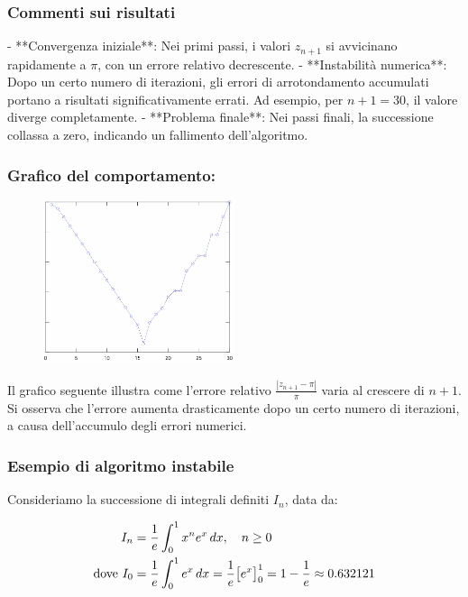 \documentclass[a4paper, 11pt]{article}
\begin{document}
        \subsubsection*{Commenti sui risultati}

        - **Convergenza iniziale**: Nei primi passi, i valori \( z_{n+1} \) si avvicinano rapidamente a \( \pi \), con un errore relativo decrescente.
        - **Instabilità numerica**: Dopo un certo numero di iterazioni, gli errori di arrotondamento accumulati portano a risultati significativamente errati. Ad esempio, per \( n+1 = 30 \), il valore diverge completamente.
        - **Problema finale**: Nei passi finali, la successione collassa a zero, indicando un fallimento dell'algoritmo.

        \subsubsection*{Grafico del comportamento: }

        \begin{figure}[h!] 
            \centering 
            \includegraphics[width=0.5\textwidth]{graph1.png} 
        \end{figure}

        Il grafico seguente illustra come l'errore relativo \( \frac{|z_{n+1} - \pi|}{\pi} \) varia al crescere di \( n+1 \). Si osserva che l'errore aumenta drasticamente dopo un certo numero di iterazioni, a causa dell'accumulo degli errori numerici.

        \subsubsection*{Esempio di algoritmo instabile}
        

        Consideriamo la successione di integrali definiti \( I_n \), data da:


        \begin{align}
            I_n &= \frac{1}{e} \int_{0}^{1} x^n e^x \, dx, \quad n \geq 0 \notag \\
            \text{dove } I_0 &= \frac{1}{e} \int_{0}^{1} e^x \, dx = \frac{1}{e} \big[ e^x \big]_0^1 = 1 - \frac{1}{e} \approx 0.632121 \notag
        \end{align}
        
\end{document}
